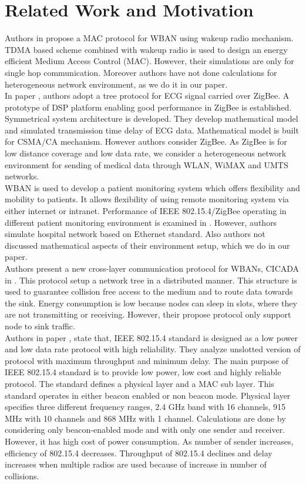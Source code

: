 \documentclass[11pt, conference, compsocconf, onecolumn]{IEEEtran}
\begin{document}
\section{Related Work and Motivation}
\indent Authors in \cite{9} propose a MAC protocol for WBAN using wakeup radio mechanism. TDMA based scheme combined with wakeup radio is used to design an energy efficient Medium Access Control (MAC). However, their simulations are only for single hop communication. Moreover authors have not done calculations for heterogeneous network environment, as we do it in our paper.
\\
\indent In paper \cite{3}, authors adopt a tree protocol for ECG signal carried over ZigBee. A prototype of DSP platform enabling good performance in ZigBee is established. Symmetrical system architecture is developed. They develop mathematical model and simulated transmission time delay of ECG data. Mathematical model is built for CSMA/CA mechanism. However authors consider ZigBee. As ZigBee is for low distance coverage and low data rate, we consider a heterogeneous network environment for sending of medical data through WLAN, WiMAX and UMTS networks.
\\
\indent WBAN is used to develop a patient monitoring system which offers flexibility and mobility to patients. It allows flexibility of using remote monitoring system via either internet or intranet. Performance of IEEE 802.15.4/ZigBee operating in different patient monitoring environment is examined in \cite{4}. However, authors simulate hospital network based on Ethernet standard. Also authors not discussed mathematical aspects of their environment setup, which we do in our paper.
\\
\indent Authors present a new cross-layer communication protocol for WBANs,  CICADA in \cite{7}. This protocol setup a network tree in a distributed manner. This structure is used to guarantee collision free access to the medium and to route data towards the sink. Energy consumption is low because nodes can sleep in slots, where they are not transmitting or receiving. However, their propose protocol only support node to sink traffic.
\\
\indent Authors in paper \cite{2}, state that, IEEE 802.15.4 standard is designed as a low power and low data rate protocol with high reliability. They analyze unslotted version of protocol with maximum throughput and minimum delay. The main purpose of IEEE 802.15.4 standard is to provide low power, low cost and highly reliable protocol. The standard defines a physical layer and a MAC sub layer. This standard operates in either beacon enabled or non beacon mode. Physical layer specifies three different frequency ranges, 2.4 GHz band with 16 channels, 915 MHz with 10 channels and 868 MHz with 1 channel. Calculations are done by considering only beacon-enabled mode and with only one sender and receiver. However, it has high cost of power consumption. As number of sender increases, efficiency of 802.15.4 decreases. Throughput of 802.15.4 declines and delay increases when multiple radios are used because of increase in number of collisions.
\end{document}
